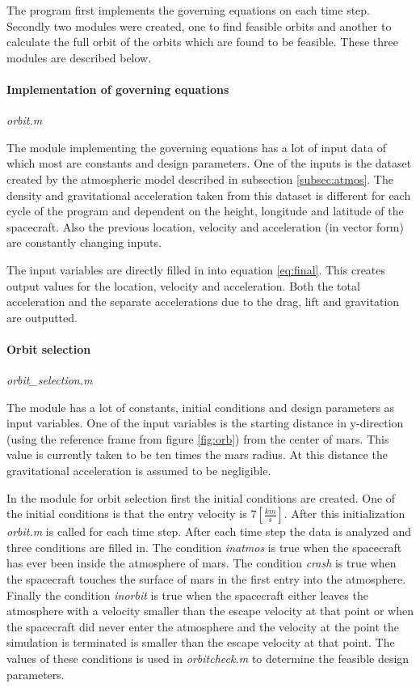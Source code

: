 The program first implements the governing equations on each time step. Secondly two modules were created, one to find feasible orbits and another to calculate the full orbit of the orbits which are found to be feasible. These three modules are described below.

\paragraph{Implementation of governing equations}\textit{orbit.m}

The module implementing the governing equations has a lot of input data of which most are constants and design parameters. One of the inputs is the dataset created by the atmospheric model described in subsection \ref{subsec:atmos}. The density and gravitational acceleration taken from this dataset is different for each cycle of the program and dependent on the height, longitude and latitude of the spacecraft. Also the previous location, velocity and acceleration (in vector form) are constantly changing inputs.

The input variables are directly filled in into equation \ref{eq:final}. This creates output values for the location, velocity and acceleration. Both the total acceleration and the separate accelerations due to the drag, lift and gravitation are outputted.
\paragraph{Orbit selection} \textit{orbit\_selection.m}

The module has a lot of constants, initial conditions and design parameters as input variables. One of the input variables is the starting distance in y-direction (using the reference frame from figure \ref{fig:orb}) from the center of mars. This value is currently taken to be ten times the mars radius. At this distance the gravitational acceleration is assumed to be negligible. 

In the module for orbit selection first the initial conditions are created. One of the initial conditions is that the entry velocity is $7 [\frac{km}{s}]$. After this initialization \textit{orbit.m} is called for each time step. After each time step the data is analyzed and three conditions are filled in. The condition \textit{inatmos} is true when the spacecraft has ever been inside the atmosphere of mars. The condition \textit{crash} is true when the spacecraft touches the surface of mars in the first entry into the atmosphere. Finally the condition \textit{inorbit} is true when the spacecraft either leaves the atmosphere with a velocity smaller than the escape velocity at that point or when the spacecraft did never enter the atmosphere and the velocity at the point the simulation is terminated is smaller than the escape velocity at that point. The values of these conditions is used in \textit{orbitcheck.m} to determine the feasible design parameters.

